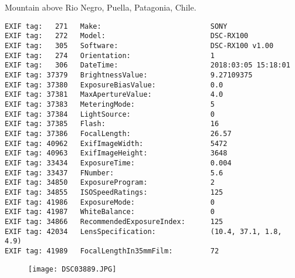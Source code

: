 \section{\protect{}}
\noindent Mountain above Rio Negro, Puella, Patagonia, Chile.
\noindent
\begin{lstlisting}
EXIF tag:   271   Make:                          SONY
EXIF tag:   272   Model:                         DSC-RX100
EXIF tag:   305   Software:                      DSC-RX100 v1.00
EXIF tag:   274   Orientation:                   1
EXIF tag:   306   DateTime:                      2018:03:05 15:18:01
EXIF tag: 37379   BrightnessValue:               9.27109375
EXIF tag: 37380   ExposureBiasValue:             0.0
EXIF tag: 37381   MaxApertureValue:              4.0
EXIF tag: 37383   MeteringMode:                  5
EXIF tag: 37384   LightSource:                   0
EXIF tag: 37385   Flash:                         16
EXIF tag: 37386   FocalLength:                   26.57
EXIF tag: 40962   ExifImageWidth:                5472
EXIF tag: 40963   ExifImageHeight:               3648
EXIF tag: 33434   ExposureTime:                  0.004
EXIF tag: 33437   FNumber:                       5.6
EXIF tag: 34850   ExposureProgram:               2
EXIF tag: 34855   ISOSpeedRatings:               125
EXIF tag: 41986   ExposureMode:                  0
EXIF tag: 41987   WhiteBalance:                  0
EXIF tag: 34866   RecommendedExposureIndex:      125
EXIF tag: 42034   LensSpecification:             (10.4, 37.1, 1.8, 4.9)
EXIF tag: 41989   FocalLengthIn35mmFilm:         72

\end{lstlisting}
\clearpage
\begin{figure}
\raggedleft
\texttt{[image: DSC03889.JPG]}
\end{figure}


\clearpage
